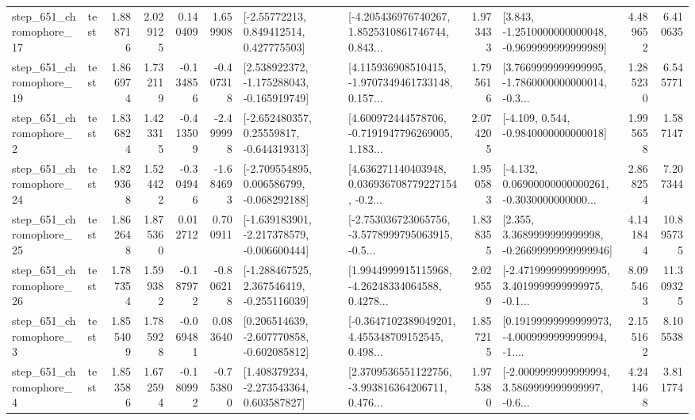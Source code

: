 \begin{tabular}{llrrrrllrlrr}
  step\_651\_chromophore\_17 &      test &      1.888716 &    2.029125 &      0.140409 &  1.659908 &     [-2.55772213, 0.849412514, 0.427775503] &  [-4.205436976740267, 1.8525310861746744, 0.843... &       1.973433 &  [3.843, -1.2510000000000048, -0.9699999999999989] &            4.489652 &          6.410635 \\
  step\_651\_chromophore\_19 &      test &      1.866974 &    1.732119 &     -0.134856 & -0.407318 &   [2.538922372, -1.175288043, -0.165919749] &  [4.115936908510415, -1.9707349461733148, 0.157... &       1.795616 &  [3.7669999999999995, -1.7860000000000014, -0.3... &            1.285230 &          6.545771 \\
   step\_651\_chromophore\_2 &      test &      1.836824 &    1.423315 &     -0.413509 & -2.499998 &    [-2.652480357, 0.25559817, -0.644319313] &  [4.600972444578706, -0.7191947796269005, 1.183... &       2.074205 &               [-4.109, 0.544, -0.9840000000000018] &            1.995658 &          1.587147 \\
  step\_651\_chromophore\_24 &      test &      1.829368 &    1.524422 &     -0.304946 & -1.684693 &   [-2.709554895, 0.006586799, -0.068292188] &  [4.636271140403948, 0.036936708779227154, -0.2... &       1.950583 &  [-4.132, 0.06900000000000261, -0.3030000000000... &            2.868254 &          7.207344 \\
  step\_651\_chromophore\_25 &      test &      1.862648 &    1.875360 &      0.012712 &  0.700911 &  [-1.639183901, -2.217378579, -0.006600444] &  [-2.753036723065756, -3.5778999795063915, -0.5... &       1.838355 &  [2.355, 3.3689999999999998, -0.26699999999999946] &            4.141844 &         10.895735 \\
  step\_651\_chromophore\_26 &      test &      1.787354 &    1.599382 &     -0.187972 & -0.806218 &   [-1.288467525, 2.367546419, -0.255116039] &  [1.9944999915115968, -4.26248334064588, 0.4278... &       2.029559 &  [-2.4719999999999995, 3.4019999999999975, -0.1... &            8.095463 &         11.309325 \\
   step\_651\_chromophore\_3 &      test &      1.855409 &    1.785928 &     -0.069481 &  0.083640 &   [0.206514639, -2.607770858, -0.602085812] &  [-0.3647102389049201, 4.455348709152545, 0.498... &       1.857215 &  [0.19199999999999973, -4.0009999999999994, -1.... &            2.155162 &          8.105538 \\
   step\_651\_chromophore\_4 &      test &      1.853586 &    1.672594 &     -0.180992 & -0.753800 &    [1.408379234, -2.273543364, 0.603587827] &  [2.3709536551122756, -3.993816364206711, 0.476... &       1.975380 &  [-2.0009999999999994, 3.5869999999999997, -0.6... &            4.241468 &          3.811774 \\

\end{tabular}
